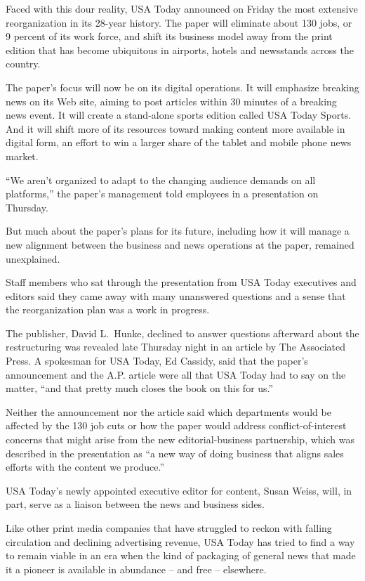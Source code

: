﻿\documentclass[12pt]{article}
\begin{document}
Faced with this dour reality, USA Today announced on Friday the most extensive reorganization in its
28-year history. The paper will eliminate about 130 jobs, or 9 percent of its work force, and shift
its business model away from the print edition that has become ubiquitous in airports, hotels and
newsstands across the country.

The paper's focus will now be on its digital operations. It will emphasize breaking news on its Web
site, aiming to post articles within 30 minutes of a breaking news event. It will create a
stand-alone sports edition called USA Today Sports. And it will shift more of its resources toward
making content more available in digital form, an effort to win a larger share of the tablet and
mobile phone news market.

``We aren't organized to adapt to the changing audience demands on all platforms,'' the paper's
management told employees in a presentation on Thursday.

But much about the paper's plans for its future, including how it will manage a new alignment
between the business and news operations at the paper, remained unexplained.

Staff members who sat through the presentation from USA Today executives and editors said they came
away with many unanswered questions and a sense that the reorganization plan was a work in progress.

The publisher, David L.~Hunke, declined to answer questions afterward about the restructuring was
revealed late Thursday night in an article by The Associated Press. A spokesman for USA Today, Ed
Cassidy, said that the paper's announcement and the A.P. article were all that USA Today had to say
on the matter, ``and that pretty much closes the book on this for us.''

Neither the announcement nor the article said which departments would be affected by the 130 job
cuts or how the paper would address conflict-of-interest concerns that might arise from the new
editorial-business partnership, which was described in the presentation as ``a new way of doing
business that aligns sales efforts with the content we produce.''

USA Today's newly appointed executive editor for content, Susan Weiss, will, in part, serve as a
liaison between the news and business sides.

Like other print media companies that have struggled to reckon with falling circulation and
declining advertising revenue, USA Today has tried to find a way to remain viable in an era when the
kind of packaging of general news that made it a pioneer is available in abundance -- and free --
elsewhere.
\end{document}
